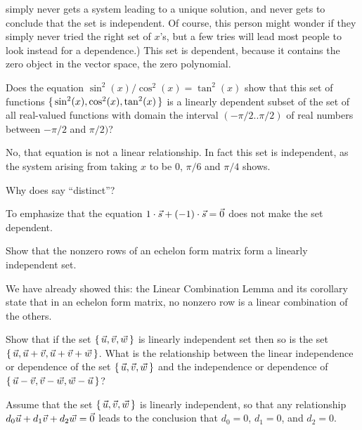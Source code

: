 \begin{exercises}
\begin{answer}
\begin{exparts}
          simply never gets a system leading to a unique solution, and
          never gets to conclude that the set is independent.
          Of course, this person might wonder if they simply never tried the
          right set of $x$'s, but a few tries will lead most people to 
          look instead for a dependence.)
        \partsitem This set is dependent, because it contains the 
          zero object in the vector space, the zero polynomial.
      \end{exparts}  
     \end{answer}
  \item 
    Does the equation \( \sin^2(x)/\cos^2(x)=\tan^2(x) \) show that
    this set of functions
    \( \mbox{$\{\,\sin^2(x),\cos^2(x),\tan^2(x)\,\}$} \) is a linearly dependent
    subset of the set of all real-valued functions with domain
    the interval \( (-\pi/2..\pi/2) \) of real numbers between 
    \( -\pi/2 \) and \( \pi/2) \)?
    \begin{answer}
      No, that equation is not a linear relationship.
      In fact this set is independent, as the system arising from taking
      \( x \) to be \( 0 \), \( \pi/6 \) and \( \pi/4 \) shows.  
    \end{answer}
  \item  
    Why does  say ``distinct''?
    \begin{answer}
      To emphasize that the equation 
      \( 1\cdot\vec{s}+(-1)\cdot\vec{s}=\vec{0} \)
      does not make the set dependent.
    \end{answer}
  \recommended \item
    Show that the nonzero rows of an echelon form matrix form a linearly
    independent set.
    \begin{answer}
      We have already showed this: the Linear Combination
      Lemma and its corollary state that in an echelon form matrix, 
      no nonzero row is a linear combination of the others.  
    \end{answer}
  \recommended \item
     \begin{exparts}
       \partsitem Show that if the set \( \mbox{$\{\,\vec{u},\vec{v},\vec{w}\,\}$} \)
          is linearly independent set then so is the set
          \( \mbox{$\{\,\vec{u},\vec{u}+\vec{v},\vec{u}+\vec{v}+\vec{w}\,\}$} \).
       \partsitem  What is the relationship between the linear independence
         or dependence of the set \( \mbox{$\{\,\vec{u},\vec{v},\vec{w}\,\}$} \) and the
         independence or dependence of
         \( \mbox{$\{\,\vec{u}-\vec{v},\vec{v}-\vec{w},\vec{w}-\vec{u}\,\}$} \)?
     \end{exparts}
     \begin{answer}
       \begin{exparts}
         \partsitem Assume that the set 
           \( \mbox{$\{\,\vec{u},\vec{v},\vec{w}\,\}$} \) is linearly 
           independent, so that any relationship
           $d_0\vec{u}+d_1\vec{v}+d_2\vec{w}=\vec{0}$ leads to the conclusion 
           that $d_0=0$, $d_1=0$, and $d_2=0$.


\end{exparts}
\end{answer}
\end{exercises}
